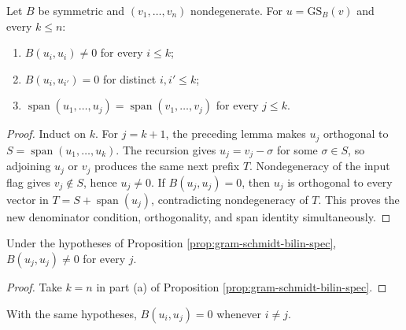 \begin{proposition}
\label{prop:gram-schmidt-bilin-spec}
\leanok
{}
Let $B$ be symmetric and $(v_1,\ldots,v_n)$ nondegenerate. For
$u=\mathrm{GS}_B(v)$ and every $k\leq n$:
\begin{enumerate}[label=(\alph*)]
\item $B(u_i,u_i)\ne0$ for every $i\leq k$;
\item $B(u_i,u_{i'})=0$ for distinct $i,i'\leq k$;
\item $\operatorname{span}(u_1,\ldots,u_j)=
\operatorname{span}(v_1,\ldots,v_j)$ for every $j\leq k$.
\end{enumerate}
\end{proposition}

\begin{proof}
\leanok
{}
\sketch Induct on $k$. For $j=k+1$, the preceding lemma makes $u_j$ orthogonal
to $S=\operatorname{span}(u_1,\ldots,u_k)$. The recursion gives
$u_j=v_j-\sigma$ for some $\sigma\in S$, so adjoining $u_j$ or $v_j$ produces
the same next prefix $T$. Nondegeneracy of the input flag gives $v_j\notin S$,
hence $u_j\ne0$. If $B(u_j,u_j)=0$, then $u_j$ is orthogonal to every vector in
$T=S+\operatorname{span}(u_j)$, contradicting nondegeneracy of $T$. This proves
the new denominator condition, orthogonality, and span identity simultaneously.
\end{proof}

\begin{lemma}
\label{lem:gram-schmidt-bilin-nonvanishing}
\leanok
{}
Under the hypotheses of Proposition \ref{prop:gram-schmidt-bilin-spec},
$B(u_j,u_j)\ne0$ for every $j$.
\end{lemma}

\begin{proof}
\leanok
{}
\sketch Take $k=n$ in part (a) of Proposition
\ref{prop:gram-schmidt-bilin-spec}.
\end{proof}

\begin{lemma}
\label{lem:gram-schmidt-bilin-orthogonal}
\leanok
{}
With the same hypotheses, $B(u_i,u_j)=0$ whenever $i\ne j$.
\end{lemma}

